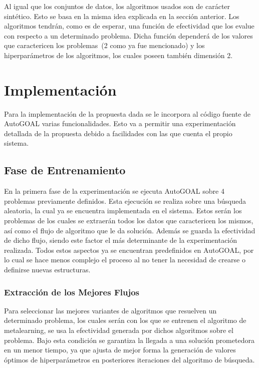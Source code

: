 Al igual que los conjuntos de datos, los algoritmos usados son de carácter
sintético. Esto se basa en la misma idea explicada en la sección anterior. Los
algoritmos tendrán, como es de esperar, una función de efectividad que los
evalue con respecto a un determinado problema. Dicha función dependerá de los
valores que caractericen los problemas~(2 como ya fue mencionado) y los
hiperparámetros de los algoritmos, los cuales poseen también dimensión 2.

\section{Implementación}\label{sec:det_impl}

Para la implementación de la propuesta dada se le incorpora al código fuente
de AutoGOAL varias funcionalidades. Esto va a permitir una experimentación
detallada de la propuesta debido a facilidades con las que cuenta el propio
sistema.

\subsection{Fase de Entrenamiento}

En la primera fase de la experimentación se ejecuta AutoGOAL sobre 4 problemas
previamente definidos. Esta ejecución se realiza sobre una búsqueda aleatoria,
la cual ya se encuentra implementada en el sistema. Estos serán los problemas
de los cuales se extraerán todos los datos que caractericen los mismos, así
como el flujo de algoritmo que le da solución. Además se guarda la efectividad
de dicho flujo, siendo este factor el más determinante de la experimentación
realizada. Todos estos aspectos ya se encuentran predefinidos en AutoGOAL, por
lo cual se hace menos complejo el proceso al no tener la necesidad de crearse
o definirse nuevas estructuras.

\subsubsection{Extracción de los Mejores Flujos}

Para seleccionar las mejores variantes de algoritmos que resuelven un
determinado problema, los cuales serán con los que se entrenen el algoritmo
de metalearning, se usa la efectividad generada por dichos algoritmos sobre
el problema. Bajo esta condición se garantiza la llegada a una solución
prometedora en un menor tiempo, ya que ajusta de mejor forma la generación de
valores óptimos de hiperparámetros en posteriores iteraciones del algoritmo de
búsqueda.

